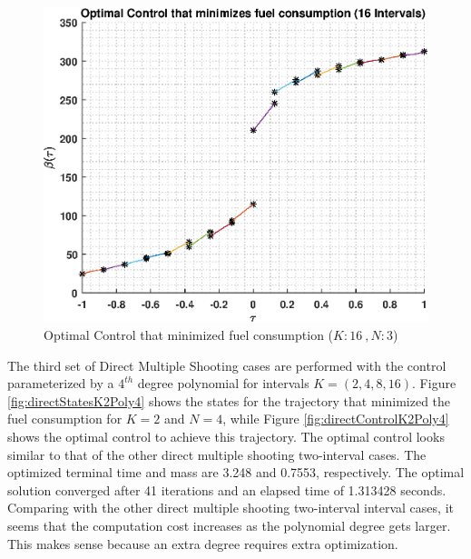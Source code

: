 \documentclass[]{article}
\begin{document}
\begin{figure}
	\centering
	\includegraphics[scale=0.75]{directControlK16Poly3.eps}
	\caption{Optimal Control that minimized fuel consumption (\(K:16\ , N:3\))}
	\label{fig:directControlK16Poly3}
\end{figure}
\FloatBarrier
\noindent
The third set of Direct Multiple Shooting cases are performed with the control parameterized by a \(4^{th}\) degree polynomial for intervals \(K = (2,4,8,16)\). Figure \ref{fig:directStatesK2Poly4} shows the states for the trajectory that minimized the fuel consumption for \(K = 2\) and  \(N = 4\), while Figure \ref{fig:directControlK2Poly4} shows the optimal control to achieve this trajectory. The optimal control looks similar to that of the other direct multiple shooting two-interval cases. The optimized terminal time and mass are 3.248 and 0.7553, respectively. The optimal solution converged after 41 iterations and an elapsed time of 1.313428 seconds. Comparing with the other direct multiple shooting two-interval interval cases, it seems that the computation cost increases as the polynomial degree gets larger. This makes sense because an extra degree requires extra optimization.
\end{document}
